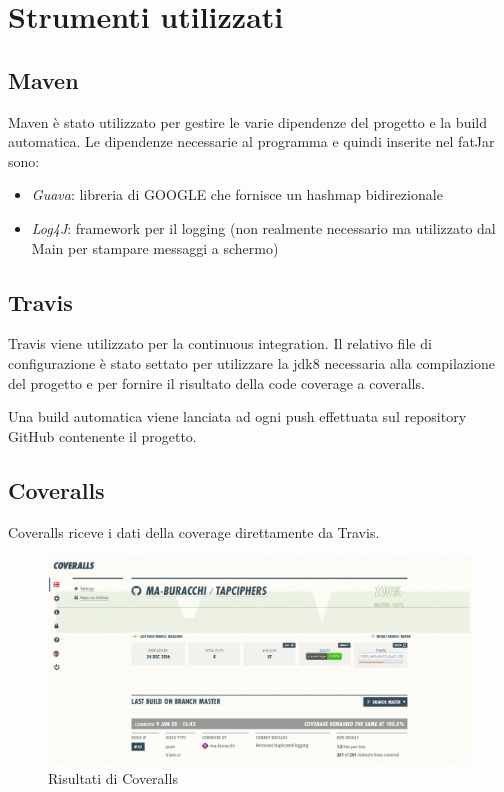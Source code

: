 \chapter{Strumenti utilizzati}

	\section{Maven}
		Maven è stato utilizzato per gestire le varie dipendenze del progetto e la build automatica.
		Le dipendenze necessarie al programma e quindi inserite nel fatJar sono: 
		\begin{itemize}
			\item \emph{Guava}: libreria di GOOGLE che fornisce un hashmap bidirezionale
			\item \emph{Log4J}: framework per il logging (non realmente necessario ma utilizzato dal Main per stampare messaggi a schermo)
		\end{itemize}
		
	\section{Travis}
		Travis viene utilizzato per la continuous integration. Il relativo file di configurazione è stato settato per utilizzare la jdk8 necessaria alla compilazione del progetto e per fornire il risultato della code coverage a coveralls.
		
		Una build automatica viene lanciata ad ogni push effettuata sul repository GitHub contenente il progetto.
		
	\section{Coveralls}
		Coveralls riceve i dati della coverage direttamente da Travis.
		
		\begin{figure}[h]
			\centering
			\includegraphics[scale=0.2]{img/coverall}
			\caption{Risultati di Coveralls}
			\label{fig:coveralls}
		\end{figure}
				

